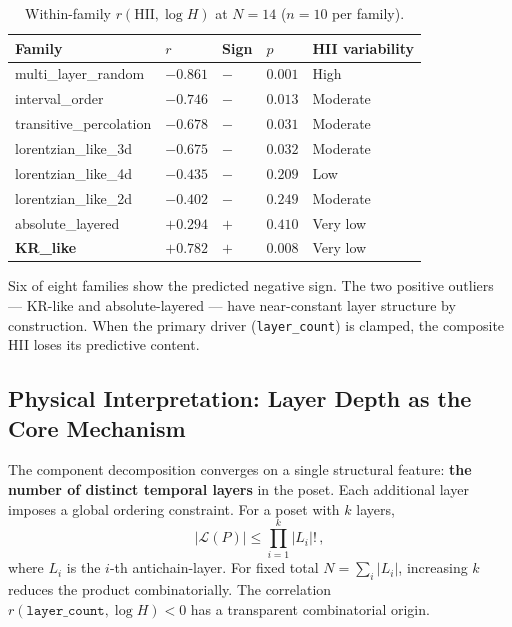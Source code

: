 \documentclass[entropy,article,submit,pdftex,moreauthors]{Definitions/mdpi}
\begin{document}
\begin{table}[H]
\caption{Within-family $r(\text{HII}, \log H)$ at $N = 14$ ($n = 10$ per family).\label{tab:within_family}}
\begin{tabular}{lllll}
\toprule
\textbf{Family} & \boldmath$r$ & \textbf{Sign} & \boldmath$p$ & \textbf{HII variability} \\
\midrule
multi\_layer\_random & $-0.861$ & $-$ & $0.001$ & High \\
interval\_order & $-0.746$ & $-$ & $0.013$ & Moderate \\
transitive\_percolation & $-0.678$ & $-$ & $0.031$ & Moderate \\
lorentzian\_like\_3d & $-0.675$ & $-$ & $0.032$ & Moderate \\
lorentzian\_like\_4d & $-0.435$ & $-$ & $0.209$ & Low \\
lorentzian\_like\_2d & $-0.402$ & $-$ & $0.249$ & Moderate \\
absolute\_layered & $+0.294$ & $+$ & $0.410$ & Very low \\
\textbf{KR\_like} & $\mathbf{+0.782}$ & $+$ & $0.008$ & Very low \\
\bottomrule
\end{tabular}
\end{table}

Six of eight families show the predicted negative sign. The two positive outliers --- KR-like and absolute-layered --- have near-constant layer structure by construction. When the primary driver (\texttt{layer\_count}) is clamped, the composite HII loses its predictive content.

\subsection{Physical Interpretation: Layer Depth as the Core Mechanism}

The component decomposition converges on a single structural feature: \textbf{the number of distinct temporal layers} in the poset. Each additional layer imposes a global ordering constraint. For a poset with $k$ layers,
\begin{equation}
    |\mathcal{L}(P)| \leq \prod_{i=1}^{k} |L_i|!\,,
    \label{eq:layer_bound}
\end{equation}
where $L_i$ is the $i$-th antichain-layer. For fixed total $N = \sum_i |L_i|$, increasing $k$ reduces the product combinatorially. The correlation $r(\texttt{layer\_count}, \log H) < 0$ has a transparent combinatorial origin.
\end{document}
